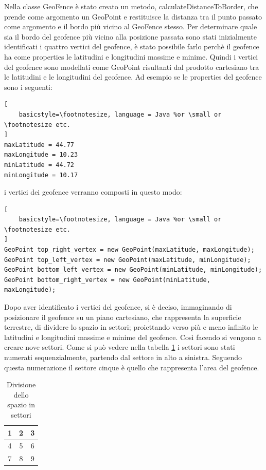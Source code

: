Nella classe GeoFence è stato creato un metodo, calculateDistanceToBorder, che prende come argomento un GeoPoint e restituisce la distanza tra il punto passato come argomento e il bordo più vicino al GeoFence stesso. Per determinare quale sia il bordo del geofence più vicino alla posizione passata sono stati inizialmente identificati i quattro vertici del geofence, è stato possibile farlo perchè il geofence ha come properties le latitudini e longitudini massime e minime. Quindi i vertici del geofence sono modellati come GeoPoint risultanti dal prodotto cartesiano tra le latitudini e le longitudini del geofence.
Ad esempio se le properties del geofence sono i seguenti:
\begin{lstlisting}[
    basicstyle=\footnotesize, language = Java %or \small or \footnotesize etc.
]
maxLatitude = 44.77
maxLongitude = 10.23
minLatitude = 44.72
minLongitude = 10.17
\end{lstlisting}

i vertici dei geofence verranno composti in questo modo:

\begin{lstlisting}[
    basicstyle=\footnotesize, language = Java %or \small or \footnotesize etc.
]
GeoPoint top_right_vertex = new GeoPoint(maxLatitude, maxLongitude);
GeoPoint top_left_vertex = new GeoPoint(maxLatitude, minLongitude);
GeoPoint bottom_left_vertex = new GeoPoint(minLatitude, minLongitude);
GeoPoint bottom_right_vertex = new GeoPoint(minLatitude, maxLongitude);
\end{lstlisting}

Dopo aver identificato i vertici del geofence, si è deciso, immaginando di posizionare il geofence su un piano cartesiano, che rappresenta la superficie terrestre, di dividere lo spazio in settori; proiettando verso più e meno infinito le latitudini e longitudini massime e minime del geofence. Così facendo si vengono a creare nove settori. Come si può vedere nella tabella \ref{tab:settori} i settori sono stati numerati sequenzialmente, partendo dal settore in alto a sinistra. Seguendo questa numerazione il settore cinque è quello che rappresenta l'area del geofence.

\begin{table}[ht!]
    \centering
    \begin{tabular}{c|c|c}
       1 & 2 & 3 \\
       \hline
       4 & 5 & 6 \\
    \hline
       7 & 8 & 9
    \end{tabular}
    \caption{Divisione dello spazio in settori}
    \label{tab:settori}
\end{table}

